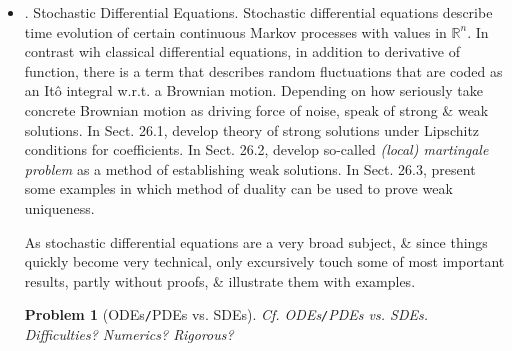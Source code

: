 \documentclass{article}
\newtheorem{problem}{Problem}
\begin{document}
\begin{enumerate}
\begin{itemize}
\begin{itemize}
		\end{itemize}
		\item {. Stochastic Differential Equations.} Stochastic differential equations describe time evolution of certain continuous Markov processes with values in $\mathbb{R}^n$. In contrast wih classical differential equations, in addition to derivative of function, there is a term that describes random fluctuations that are coded as an It\^o integral w.r.t. a Brownian motion. Depending on how seriously take concrete Brownian motion as driving force of noise, speak of strong \& weak solutions. In Sect. 26.1, develop theory of strong solutions under Lipschitz conditions for coefficients. In Sect. 26.2, develop so-called {\it(local) martingale problem} as a method of establishing weak solutions. In Sect. 26.3, present some examples in which method of duality can be used to prove weak uniqueness.
		
		As stochastic differential equations are a very broad subject, \& since things quickly become very technical, only excursively touch some of most important results, partly without proofs, \& illustrate them with examples.
		
		\begin{problem}[ODEs{\tt/}PDEs vs. SDEs]
			Cf. ODEs{\tt/}PDEs vs. SDEs. Difficulties? Numerics? Rigorous?
		\end{problem}
		

\end{itemize}
\end{enumerate}
\end{document}
